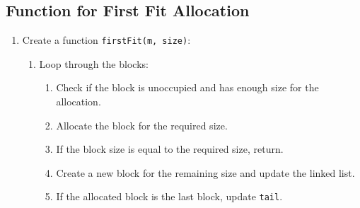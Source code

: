 {  \subsection{Function for First Fit Allocation}
  \begin{enumerate}[label=\arabic*.,left=0pt]
    \item Create a function \texttt{firstFit(m, size)}:
          \begin{enumerate}[label=2.\arabic*.,left=0pt]
            \item Loop through the blocks:
                  \begin{enumerate}[label=2.2.\arabic*.,left=0pt]
                    \item Check if the block is unoccupied and has enough size for the allocation.
                    \item Allocate the block for the required size.
                    \item If the block size is equal to the required size, return.
                    \item Create a new block for the remaining size and update the linked list.
                    \item If the allocated block is the last block, update \texttt{tail}.
                  \end{enumerate}
          \end{enumerate}
  \end{enumerate}

}
